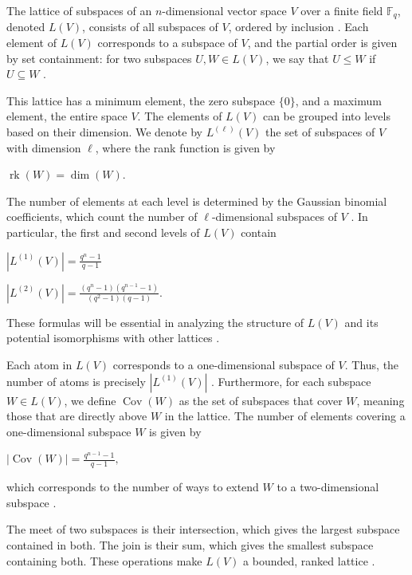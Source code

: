 \documentclass{article}
\begin{document}
The lattice of subspaces of an \( n \)-dimensional vector space \( V \) over a finite field \( \mathbb{F}_q \), denoted \( L(V) \), consists of all subspaces of \( V \), ordered by inclusion \citep{Stanley2012}. Each element of \( L(V) \) corresponds to a subspace of \( V \), and the partial order is given by set containment: for two subspaces \( U, W \in L(V) \), we say that \( U \leq W \) if \( U \subseteq W \) \citep{Birkhoff1940}.

This lattice has a minimum element, the zero subspace \( \{0\} \), and a maximum element, the entire space \( V \). The elements of \( L(V) \) can be grouped into levels based on their dimension. We denote by \( L^{(\ell)}(V) \) the set of subspaces of \( V \) with dimension \( \ell \), where the rank function is given by  

$
\operatorname{rk}(W) = \dim(W).
$

The number of elements at each level is determined by the Gaussian binomial coefficients, which count the number of \( \ell \)-dimensional subspaces of \( V \) \citep{Stanley2012, Kung1986}. In particular, the first and second levels of \( L(V) \) contain  

$
|L^{(1)}(V)| = \frac{q^n - 1}{q - 1}
$

$
|L^{(2)}(V)| = \frac{(q^n - 1)(q^{n-1} - 1)}{(q^2 - 1)(q-1)}.
$

These formulas will be essential in analyzing the structure of \( L(V) \) and its potential isomorphisms with other lattices \citep{Gratzer2011}.

Each atom in \( L(V) \) corresponds to a one-dimensional subspace of \( V \). Thus, the number of atoms is precisely \( |L^{(1)}(V)| \) \citep{Kung1986}. Furthermore, for each subspace \( W \in L(V) \), we define \( \operatorname{Cov}(W) \) as the set of subspaces that cover \( W \), meaning those that are directly above \( W \) in the lattice. The number of elements covering a one-dimensional subspace \( W \) is given by  

$
|\operatorname{Cov}(W)| = \frac{q^{n-1} - 1}{q - 1},
$

which corresponds to the number of ways to extend \( W \) to a two-dimensional subspace \citep{Stanley2012}.

The meet of two subspaces is their intersection, which gives the largest subspace contained in both. The join is their sum, which gives the smallest subspace containing both. These operations make \( L(V) \) a bounded, ranked lattice \citep{Birkhoff1940}.
\end{document}
